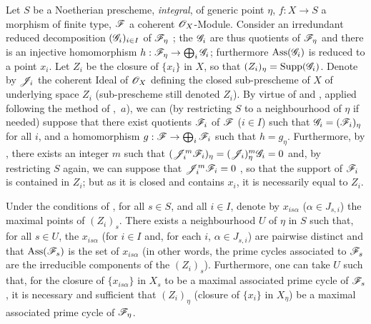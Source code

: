 \medskip
\noindent
\emph{}
Let $S$ be a Noetherian prescheme, \emph{integral}, of generic point $\eta$, $f:X\to S$ a morphism of finite type, $\mathscr{F}$ a coherent $\mathscr{O}_X$-Module.
Consider an irredundant reduced decomposition $(\mathscr{G}_i)_{i\in I}$ of $\mathscr{F}_\eta$ ; the $\mathscr{G}_i$ are thus quotients of $\mathscr{F}_\eta$ and there is an injective homomorphism $h:\mathscr{F}_\eta\to\bigoplus_i\mathscr{G}_i$; furthermore $\operatorname{Ass}(\mathscr{G}_i)$ is reduced to a point $x_i$.
Let $Z_i$ be the closure of $\{x_i\}$ in $X$, so that $(Z_i)_\eta=\operatorname{Supp}(\mathscr{G}_i)$.
Denote by $\mathscr{J}_i$ the coherent Ideal of $\mathscr{O}_X$ defining the closed sub-prescheme of $X$ of underlying space $Z_i$ (sub-prescheme still denoted $Z_i$).
By virtue of  and , applied following the method of ,~$a$), we can (by restricting $S$ to a neighbourhood of $\eta$ if needed) suppose that there exist quotients $\mathscr{F}_i$ of $\mathscr{F}$ ($i\in I$) such that $\mathscr{G}_i=(\mathscr{F}_i)_\eta$ for all $i$, and a homomorphism $g:\mathscr{F}\to\bigoplus_i\mathscr{F}_i$ such that $h=g_\eta$.
Furthermore, by , there exists an integer $m$ such that $(\mathscr{J}_i^m\mathscr{F}_i)_\eta=(\mathscr{J}_i)_\eta^m\mathscr{G}_i=0$ and, by restricting $S$ again, we can suppose that $\mathscr{J}_i^m\mathscr{F}_i=0$ , so that the support of $\mathscr{F}_i$ is contained in $Z_i$; but as it is closed and contains $x_i$, it is necessarily equal to $Z_i$.

\begin{proposition}[9.8.3]
\label{IV.9.8.3}
Under the conditions of \emph{}, for all $s\in S$, and all $i\in I$, denote by $x_{is\alpha}$ \textup{(}$\alpha\in J_{s,i}$\textup{)} the maximal points of $(Z_i)_s$.
There exists a neighbourhood $U$ of $\eta$ in $S$ such that, for all $s\in U$, the $x_{is\alpha}$ (for $i\in I$ and, for each $i$, $\alpha\in J_{s,i}$) are pairwise distinct and that $\operatorname{Ass}(\mathscr{F}_s)$ is the set of $x_{is\alpha}$ (in other words, the prime cycles associated to $\mathscr{F}_s$ are the irreducible components of the $(Z_i)_s$).
Furthermore, one can take $U$ such that, for the closure of $\{x_{is\alpha}\}$ in $X_s$ to be a maximal associated prime cycle of $\mathscr{F}_s$, it is necessary and sufficient that $(Z_i)_\eta$ (closure of $\{x_i\}$ in $X_\eta$) be a maximal associated prime cycle of $\mathscr{F}_\eta$.
\end{proposition}

